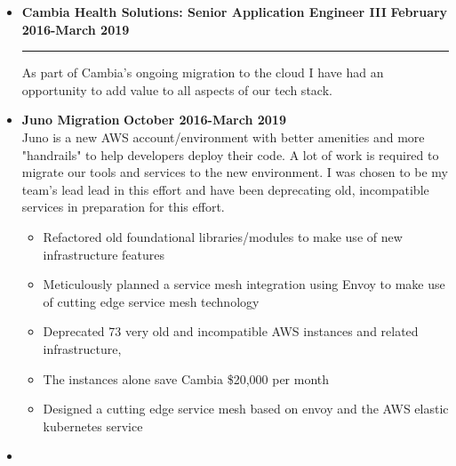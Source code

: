 \documentclass[overlapped]{res}
\begin{document}
\begin{resume}
\begin{itemize}[leftmargin=0in]
    \item[] 
        \textbf{Cambia Health Solutions: Senior Application Engineer III} \hfill \textbf{February 2016-March 2019} \\[-0.1in] \rule{\textwidth}{0.5pt}
        As part of Cambia's ongoing migration to the cloud I have had an opportunity to add value to all aspects of our tech stack.
        \vspace{0.125in}
        \item[] 
            \begin{samepage}
                \textbf{Juno Migration} \hfill \textbf{October 2016-March 2019} \\
                Juno is a new AWS account/environment with better amenities and more "handrails" to help developers deploy their code. 
                A lot of work is required to migrate our tools and services to the new environment. I was chosen to be my team's lead 
                lead in this effort and have been deprecating old, incompatible services in preparation for this effort.
                \begin{itemize}
                    \item[\textbullet] Refactored old foundational libraries/modules to make use of new infrastructure features 
                    \item[\textbullet] Meticulously planned a service mesh integration using Envoy to make use of cutting edge service mesh technology
                    \item[\textbullet] Deprecated 73 very old and incompatible AWS instances and related infrastructure, 
                    \item[\textbullet] The instances alone save Cambia \$20,000 per month
                    \item[\textbullet] Designed a cutting edge service mesh based on envoy and the AWS elastic kubernetes service
                \end{itemize}
            \end{samepage}
            \vspace{0.125in}
        \item[] 
            \begin{samepage}

\end{samepage}
\end{itemize}
\end{resume}
\end{document}
